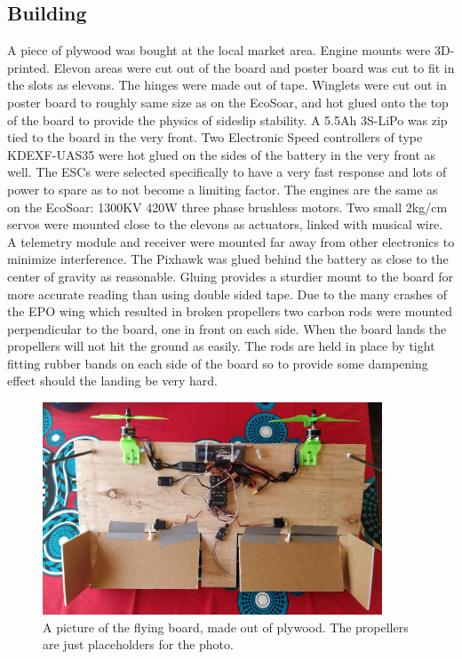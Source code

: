 \documentclass{article}
\begin{document}
\subsection{Building}
A piece of plywood was bought at the local market area.
Engine mounts were 3D-printed.
Elevon areas were cut out of the board and poster board was cut to fit in the slots as elevons.
The hinges were made out of tape.
Winglets were cut out in poster board to roughly same size as on the EcoSoar, and hot glued onto the top of the board to provide the physics of sideslip stability.
A 5.5Ah 3S-LiPo was zip tied to the board in the very front.
Two Electronic Speed controllers of type KDEXF-UAS35 were hot glued on the sides of the battery in the very front as well.
The ESCs were selected specifically to have a very fast response and lots of power to spare as to not become a limiting factor.
The engines are the same as on the EcoSoar: 1300KV 420W three phase brushless motors.
Two small 2kg/cm servos were mounted close to the elevons as actuators, linked with musical wire.
A telemetry module and receiver were mounted far away from other electronics to minimize interference.
The Pixhawk was glued behind the battery as close to the center of gravity as reasonable.
Gluing provides a sturdier mount to the board for more accurate reading than using double sided tape.
Due to the many crashes of the EPO wing which resulted in broken propellers two carbon rods were mounted perpendicular to the board, one in front on each side.
When the board lands the propellers will not hit the ground as easily.
The rods are held in place by tight fitting rubber bands on each side of the board so to provide some dampening effect should the landing be very hard.

\begin{figure}
    \center
    \includegraphics[width=0.9\textwidth]{FlyingBoard.jpg}
    \caption{A picture of the flying board, made out of plywood. The propellers are just placeholders for the photo.}
\end{figure}
\end{document}

